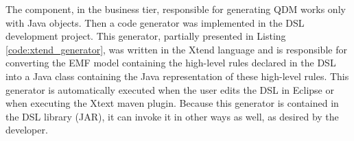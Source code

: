 \documentclass[AMA,STIX1COL,hidelinks]{WileyNJD-v2}
\begin{document}

The component, in the business tier, responsible for generating QDM works only with Java objects. Then a code generator was implemented in the DSL development project. This generator, partially presented in Listing \ref{code:xtend_generator}, was written in the Xtend language and is responsible for converting the EMF model containing the high-level rules declared in the DSL into a Java class containing the Java representation of these high-level rules. This generator is automatically executed when the user edits the DSL in Eclipse or when executing the Xtext maven plugin. Because this generator is contained in the DSL library (JAR), it can invoke it in other ways as well, as desired by the developer.

\end{document}
